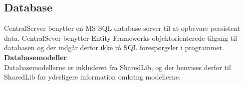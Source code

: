 \subsection{Database}
CentralServer benytter en MS SQL database server til at opbevare persistent data. CentralSever benytter Entity Frameworks objektorienterede tilgang til databasen og der indgår derfor ikke rå SQL forespørgsler i programmet.\\

\textbf{Databasemodeller}\\
Databasemodellerne er inkluderet fra SharedLib, og der henvises derfor til SharedLib for yderligere information omkring modellerne.